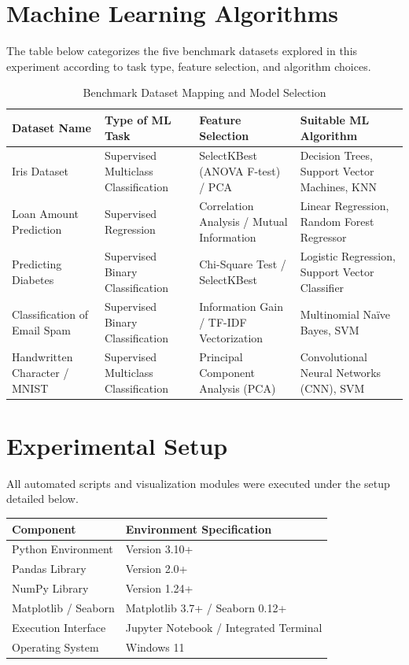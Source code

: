 \documentclass[12pt,a4paper]{article}
\begin{document}
\section{Machine Learning Algorithms}
The table below categorizes the five benchmark datasets explored in this experiment according to task type, feature selection, and algorithm choices.

\begin{table}[H]
\centering
\caption{Benchmark Dataset Mapping and Model Selection}
\label{tab:dataset_mapping}
\begin{tabular}{p{3.5cm}p{3cm}p{3cm}p{4cm}}
\toprule
Dataset Name & Type of ML Task & Feature Selection & Suitable ML Algorithm \\
\midrule
Iris Dataset & Supervised Multiclass Classification & SelectKBest (ANOVA F-test) / PCA & Decision Trees, Support Vector Machines, KNN \\
Loan Amount Prediction & Supervised Regression & Correlation Analysis / Mutual Information & Linear Regression, Random Forest Regressor \\
Predicting Diabetes & Supervised Binary Classification & Chi-Square Test / SelectKBest & Logistic Regression, Support Vector Classifier \\
Classification of Email Spam & Supervised Binary Classification & Information Gain / TF-IDF Vectorization & Multinomial Naïve Bayes, SVM \\
Handwritten Character / MNIST & Supervised Multiclass Classification & Principal Component Analysis (PCA) & Convolutional Neural Networks (CNN), SVM \\
\bottomrule
\end{tabular}
\end{table}

\section{Experimental Setup}
All automated scripts and visualization modules were executed under the setup detailed below.

\begin{table}[H]
\centering
\begin{tabular}{ll}
\toprule
Component & Environment Specification \\
\midrule
Python Environment & Version 3.10+ \\
Pandas Library & Version 2.0+ \\
NumPy Library & Version 1.24+ \\
Matplotlib / Seaborn & Matplotlib 3.7+ / Seaborn 0.12+ \\
Execution Interface & Jupyter Notebook / Integrated Terminal \\
Operating System & Windows 11 \\
\bottomrule
\end{tabular}
\end{table}
\end{document}
